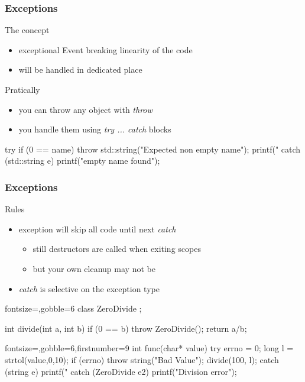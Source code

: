 \begin{frame}[fragile]
  \frametitle{Exceptions}
  \begin{block}{The concept}
    \begin{itemize}
    \item exceptional Event breaking linearity of the code
    \item will be handled in dedicated place
    \end{itemize}
  \end{block}
  \begin{block}{Pratically}
    \begin{itemize}
    \item you can throw any object with {\it throw}
    \item you handle them using {\it try ... catch} blocks
    \end{itemize}
  \end{block}
  \begin{cppcode}
    try {
      if (0 == name) {
        throw std::string("Expected non empty name");
      }
      printf("%
    } catch (std::string e) {
      printf("empty name found\n");      
    }
  \end{cppcode}
\end{frame}

\begin{frame}[fragile]
  \frametitle{Exceptions}
  \begin{block}{Rules}
    \begin{itemize}
    \item exception will skip all code until next {\it catch}
    \begin{itemize}
      \item still destructors are called when exiting scopes
      \item but your own cleanup may not be
    \end{itemize}
    \item {\it catch} is selective on the exception type
    \end{itemize}
  \end{block}
  \begin{multicols}{2}
    \begin{cppcode*}{fontsize=\scriptsize,gobble=6}
      class ZeroDivide {};
      
      int divide(int a, int b) {
        if (0 == b) {
          throw ZeroDivide();
        }
        return a/b;
      }
    \end{cppcode*}
    \columnbreak
    \begin{cppcode*}{fontsize=\scriptsize,gobble=6,firstnumber=9} 
      int func(char* value) {
        try {
          errno = 0;
          long l = strtol(value,0,10);
          if (errno) {
            throw string("Bad Value");
          }
          divide(100, l);
        } catch (string e) {
          printf("%
        } catch (ZeroDivide e2) {
          printf("Division error\n");
        }
      }
    \end{cppcode*}
  \end{multicols}
\end{frame}

